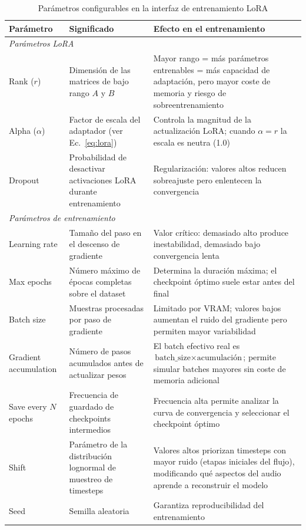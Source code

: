 \documentclass[%
    school=etsisi,%
    type=pfg,%
    degree=61CD,%
]{upm-report}
\begin{document}
\begin{table}[htbp]
    \centering
    \caption{Par\'ametros configurables en la interfaz de entrenamiento LoRA}
    \label{tab:params-ui}
    \small
    \begin{tabular}{lp{3.8cm}p{5cm}}
        \toprule
        \textbf{Par\'ametro} & \textbf{Significado} & \textbf{Efecto en el entrenamiento} \\
        \midrule
        \multicolumn{3}{l}{\textit{Par\'ametros LoRA}} \\
        \midrule
        Rank ($r$) & Dimensi\'on de las matrices de bajo rango $A$ y $B$ & Mayor rango = m\'as par\'ametros entrenables = m\'as capacidad de adaptaci\'on, pero mayor coste de memoria y riesgo de sobreentrenamiento \\
        Alpha ($\alpha$) & Factor de escala del adaptador (ver Ec.~\ref{eq:lora}) & Controla la magnitud de la actualizaci\'on LoRA; cuando $\alpha = r$ la escala es neutra (1.0) \\
        Dropout & Probabilidad de desactivar activaciones LoRA durante entrenamiento & Regularizaci\'on: valores altos reducen sobreajuste pero enlentecen la convergencia \\
        \midrule
        \multicolumn{3}{l}{\textit{Par\'ametros de entrenamiento}} \\
        \midrule
        Learning rate & Tama\~no del paso en el descenso de gradiente & Valor cr\'itico: demasiado alto produce inestabilidad, demasiado bajo convergencia lenta \\
        Max epochs & N\'umero m\'aximo de \'epocas completas sobre el dataset & Determina la duraci\'on m\'axima; el checkpoint \'optimo suele estar antes del final \\
        Batch size & Muestras procesadas por paso de gradiente & Limitado por VRAM; valores bajos aumentan el ruido del gradiente pero permiten mayor variabilidad \\
        Gradient accumulation & N\'umero de pasos acumulados antes de actualizar pesos & El batch efectivo real es $\text{batch\_size} \times \text{acumulaci\'on}$; permite simular batches mayores sin coste de memoria adicional \\
        Save every $N$ epochs & Frecuencia de guardado de checkpoints intermedios & Frecuencia alta permite analizar la curva de convergencia y seleccionar el checkpoint \'optimo \\
        Shift & Par\'ametro de la distribuci\'on lognormal de muestreo de timesteps & Valores altos priorizan timesteps con mayor ruido (etapas iniciales del flujo), modificando qu\'e aspectos del audio aprende a reconstruir el modelo \\
        Seed & Semilla aleatoria & Garantiza reproducibilidad del entrenamiento \\
        \bottomrule
    \end{tabular}
\end{table}
\end{document}
